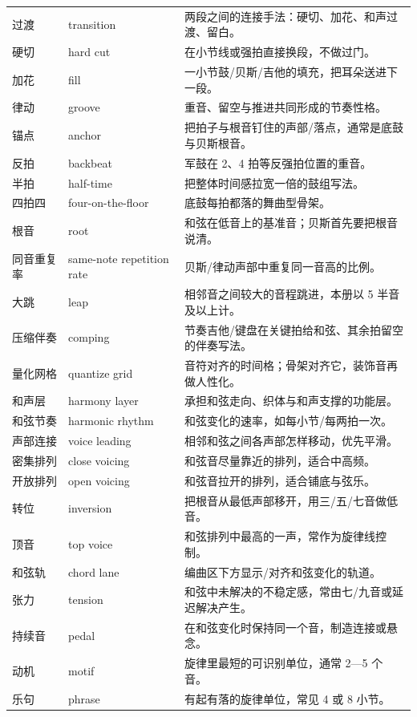 \begin{longtable}{p{}p{}p{}}
过渡 & transition & 两段之间的连接手法：硬切、加花、和声过渡、留白。 \\
硬切 & hard cut & 在小节线或强拍直接换段，不做过门。 \\
加花 & fill & 一小节鼓/贝斯/吉他的填充，把耳朵送进下一段。 \\
律动 & groove & 重音、留空与推进共同形成的节奏性格。 \\
锚点 & anchor & 把拍子与根音钉住的声部/落点，通常是底鼓与贝斯根音。 \\
反拍 & backbeat & 军鼓在 2、4 拍等反强拍位置的重音。 \\
半拍 & half-time & 把整体时间感拉宽一倍的鼓组写法。 \\
四拍四 & four-on-the-floor & 底鼓每拍都落的舞曲型骨架。 \\
根音 & root & 和弦在低音上的基准音；贝斯首先要把根音说清。 \\
同音重复率 & same-note repetition rate & 贝斯/律动声部中重复同一音高的比例。 \\
大跳 & leap & 相邻音之间较大的音程跳进，本册以 5 半音及以上计。 \\
压缩伴奏 & comping & 节奏吉他/键盘在关键拍给和弦、其余拍留空的伴奏写法。 \\
量化网格 & quantize grid & 音符对齐的时间格；骨架对齐它，装饰音再做人性化。 \\
和声层 & harmony layer & 承担和弦走向、织体与和声支撑的功能层。 \\
和弦节奏 & harmonic rhythm & 和弦变化的速率，如每小节/每两拍一次。 \\
声部连接 & voice leading & 相邻和弦之间各声部怎样移动，优先平滑。 \\
密集排列 & close voicing & 和弦音尽量靠近的排列，适合中高频。 \\
开放排列 & open voicing & 和弦音拉开的排列，适合铺底与弦乐。 \\
转位 & inversion & 把根音从最低声部移开，用三/五/七音做低音。 \\
顶音 & top voice & 和弦排列中最高的一声，常作为旋律线控制。 \\
和弦轨 & chord lane & 编曲区下方显示/对齐和弦变化的轨道。 \\
张力 & tension & 和弦中未解决的不稳定感，常由七/九音或延迟解决产生。 \\
持续音 & pedal & 在和弦变化时保持同一个音，制造连接或悬念。 \\
动机 & motif & 旋律里最短的可识别单位，通常 2—5 个音。 \\
乐句 & phrase & 有起有落的旋律单位，常见 4 或 8 小节。 \\

\end{longtable}
